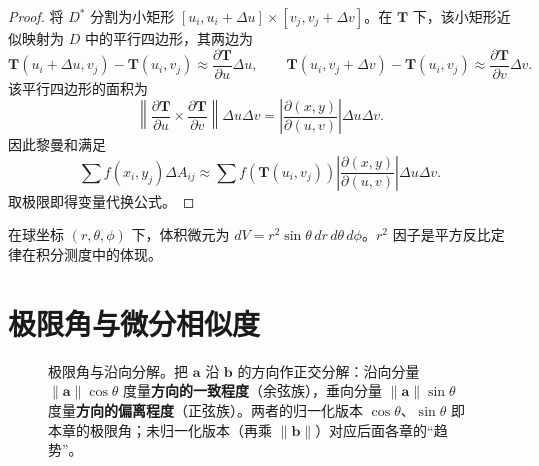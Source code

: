 \begin{proof}
将 $D^*$ 分割为小矩形 $[u_i, u_i+\Delta u] \times [v_j, v_j+\Delta v]$。在 $\mathbf{T}$ 下，该小矩形近似映射为 $D$ 中的平行四边形，其两边为
\[
\mathbf{T}(u_i+\Delta u, v_j) - \mathbf{T}(u_i, v_j) \approx \frac{\partial \mathbf{T}}{\partial u}\Delta u, \qquad
\mathbf{T}(u_i, v_j+\Delta v) - \mathbf{T}(u_i, v_j) \approx \frac{\partial \mathbf{T}}{\partial v}\Delta v.
\]
该平行四边形的面积为
\[
\left\|\frac{\partial \mathbf{T}}{\partial u} \times \frac{\partial \mathbf{T}}{\partial v}\right\| \Delta u \Delta v = \left|\frac{\partial(x,y)}{\partial(u,v)}\right| \Delta u \Delta v.
\]
因此黎曼和满足
\[
\sum f(x_i, y_j)\Delta A_{ij} \approx \sum f(\mathbf{T}(u_i, v_j)) \left|\frac{\partial(x,y)}{\partial(u,v)}\right| \Delta u \Delta v.
\]
取极限即得变量代换公式。
\end{proof}

\begin{example}[球坐标下的三重积分]\label{ex:spherical_coordinates}
在球坐标 $(r, \theta, \phi)$ 下，体积微元为 $dV = r^2 \sin\theta \, dr\, d\theta\, d\phi$。$r^2$ 因子是平方反比定律在积分测度中的体现。
\end{example}

\section{\texorpdfstring{极限角与微分相似度}{极限角与微分相似度}}

\begin{figure}[htbp]
\centering
{}
\caption{极限角与沿向分解。把 $\mathbf a$ 沿 $\mathbf b$ 的方向作正交分解：沿向分量 $\|\mathbf a\|\cos\theta$ 度量\textbf{方向的一致程度}（余弦族），垂向分量 $\|\mathbf a\|\sin\theta$ 度量\textbf{方向的偏离程度}（正弦族）。两者的归一化版本 $\cos\theta$、$\sin\theta$ 即本章的极限角；未归一化版本（再乘 $\|\mathbf b\|$）对应后面各章的“趋势”。}
\label{fig:limit_angle_decomposition}
\end{figure}

